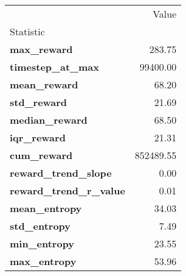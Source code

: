 \begin{tabular}{lr}
\toprule
 & Value \\
Statistic &  \\
\midrule
\textbf{max\_reward} & 283.75 \\
\textbf{timestep\_at\_max} & 99400.00 \\
\textbf{mean\_reward} & 68.20 \\
\textbf{std\_reward} & 21.69 \\
\textbf{median\_reward} & 68.50 \\
\textbf{iqr\_reward} & 21.31 \\
\textbf{cum\_reward} & 852489.55 \\
\textbf{reward\_trend\_slope} & 0.00 \\
\textbf{reward\_trend\_r\_value} & 0.01 \\
\textbf{mean\_entropy} & 34.03 \\
\textbf{std\_entropy} & 7.49 \\
\textbf{min\_entropy} & 23.55 \\
\textbf{max\_entropy} & 53.96 \\
\bottomrule
\end{tabular}
